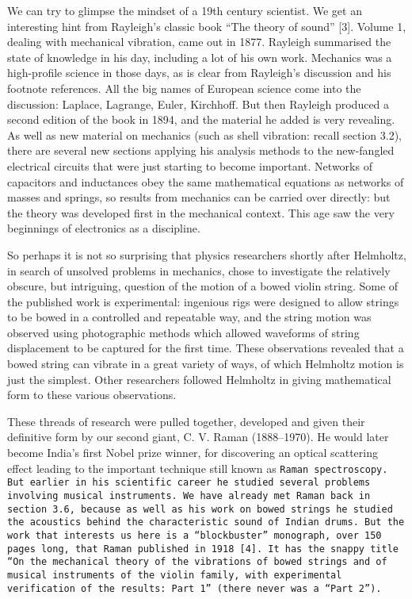   We can try to glimpse the mindset of a 19th century scientist. We get an 
  interesting hint from Rayleigh’s classic book “The theory of sound” [3]. 
  Volume 1, dealing with mechanical vibration, came out in 1877. Rayleigh 
  summarised the state of knowledge in his day, including a lot of his own 
  work. Mechanics was a high-profile science in those days, as is clear from 
  Rayleigh’s discussion and his footnote references. All the big names of 
  European science come into the discussion: Laplace, Lagrange, Euler, 
  Kirchhoff. But then Rayleigh produced a second edition of the book in 1894, 
  and the material he added is very revealing. As well as new material on 
  mechanics (such as shell vibration: recall section 3.2), there are several 
  new sections applying his analysis methods to the new-fangled electrical 
  circuits that were just starting to become important. Networks of capacitors 
  and inductances obey the same mathematical equations as networks of masses 
  and springs, so results from mechanics can be carried over directly: but the 
  theory was developed first in the mechanical context. This age saw the very 
  beginnings of electronics as a discipline. 

  So perhaps it is not so surprising that physics researchers shortly after 
  Helmholtz, in search of unsolved problems in mechanics, chose to investigate 
  the relatively obscure, but intriguing, question of the motion of a bowed 
  violin string. Some of the published work is experimental: ingenious rigs 
  were designed to allow strings to be bowed in a controlled and repeatable 
  way, and the string motion was observed using photographic methods which 
  allowed waveforms of string displacement to be captured for the first time. 
  These observations revealed that a bowed string can vibrate in a great 
  variety of ways, of which Helmholtz motion is just the simplest. Other 
  researchers followed Helmholtz in giving mathematical form to these various 
  observations. 

  These threads of research were pulled together, developed and given their 
  definitive form by our second giant, C. V. Raman (1888--1970). He would later 
  become India’s first Nobel prize winner, for discovering an optical 
  scattering effect leading to the important technique still known as 
  \tt{}Raman spectroscopy\rm{}. But earlier in his scientific career he studied 
  several problems involving musical instruments. We have already met Raman 
  back in section 3.6, because as well as his work on bowed strings he studied 
  the acoustics behind the characteristic sound of Indian drums. But the work 
  that interests us here is a “blockbuster” monograph, over 150 pages long, 
  that Raman published in 1918 [4]. It has the snappy title “On the mechanical 
  theory of the vibrations of bowed strings and of musical instruments of the 
  violin family, with experimental verification of the results: Part 1” (there 
  never was a “Part 2”). 

